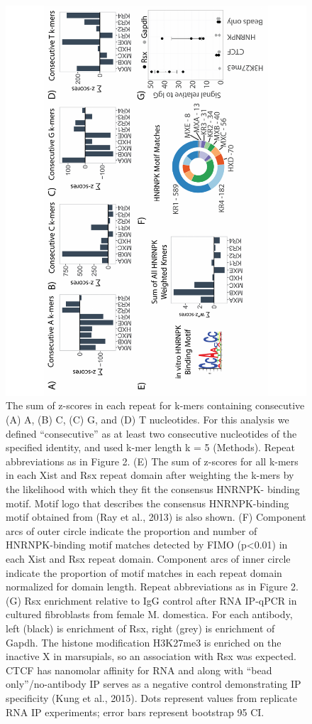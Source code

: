 \begin{figure}[h!]
\centering
\includegraphics[angle=-90, width=.95\textwidth]{images/fig4_G-01.pdf}
\caption{The sum of z-scores in each repeat for k-mers containing consecutive (A) A, (B) C, (C) G, and (D) T nucleotides. For this analysis we defined “consecutive” as at least two consecutive nucleotides of the specified identity, and used k-mer length k = 5 (Methods). Repeat abbreviations as in Figure 2. (E) The sum of z-scores for all k-mers in each Xist and Rsx repeat domain after weighting the k-mers by the likelihood with which they fit the consensus HNRNPK- binding motif. Motif logo that describes the consensus HNRNPK-binding motif obtained from (Ray et al., 2013) is also shown. (F) Component arcs of outer circle indicate the proportion and number of HNRNPK-binding motif matches detected by FIMO (p<0.01) in each Xist and Rsx repeat domain. Component arcs of inner circle indicate the proportion of motif matches in each repeat domain normalized for domain length. Repeat abbreviations as in Figure 2. (G) Rsx enrichment relative to IgG control after RNA IP-qPCR in cultured fibroblasts from female M. domestica. For each antibody, left (black) is enrichment of Rsx, right (grey) is enrichment of Gapdh. The histone modification H3K27me3 is enriched on the inactive X in marsupials, so an association with Rsx was expected. CTCF has nanomolar affinity for RNA and along with “bead only”/no-antibody IP serves as a negative control demonstrating IP specificity (Kung et al., 2015). Dots represent values from replicate RNA IP experiments; error bars represent bootstrap 95 CI.}
\end{figure}

